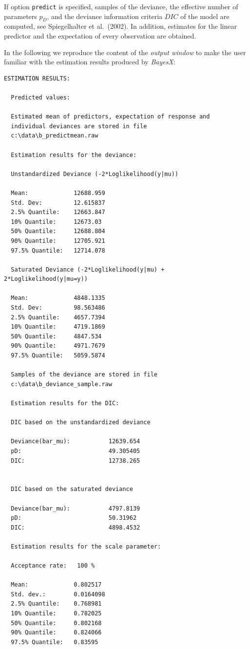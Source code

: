 \documentclass[11pt,a4paper,twoside]{bayesxreport}
\begin{document}
If option {\tt predict} is specified, samples of the deviance, the
effective number of parameters $p_D$, and the deviance information
criteria $DIC$ of the model are computed, see Spiegelhalter et
al.~(2002). In addition, estimates for the linear predictor and the
expectation of every observation are obtained.

In the following we reproduce the content of the {\em output window}
to make the user familiar with the estimation results produced by
{\em BayesX}:

\footnotesize
\begin{verbatim}
ESTIMATION RESULTS:

  Predicted values:

  Estimated mean of predictors, expectation of response and
  individual deviances are stored in file
  c:\data\b_predictmean.raw

  Estimation results for the deviance:

  Unstandardized Deviance (-2*Loglikelihood(y|mu))

  Mean:             12688.959
  Std. Dev:         12.615837
  2.5% Quantile:    12663.847
  10% Quantile:     12673.03
  50% Quantile:     12688.804
  90% Quantile:     12705.921
  97.5% Quantile:   12714.078

  Saturated Deviance (-2*Loglikelihood(y|mu) + 2*Loglikelihood(y|mu=y))

  Mean:             4848.1335
  Std. Dev:         98.563486
  2.5% Quantile:    4657.7394
  10% Quantile:     4719.1869
  50% Quantile:     4847.534
  90% Quantile:     4971.7679
  97.5% Quantile:   5059.5874

  Samples of the deviance are stored in file
  c:\data\b_deviance_sample.raw

  Estimation results for the DIC:

  DIC based on the unstandardized deviance

  Deviance(bar_mu):           12639.654
  pD:                         49.305405
  DIC:                        12738.265


  DIC based on the saturated deviance

  Deviance(bar_mu):           4797.8139
  pD:                         50.31962
  DIC:                        4898.4532

  Estimation results for the scale parameter:

  Acceptance rate:   100 %

  Mean:             0.802517
  Std. dev.:        0.0164098
  2.5% Quantile:    0.768981
  10% Quantile:     0.782025
  50% Quantile:     0.802168
  90% Quantile:     0.824066
  97.5% Quantile:   0.83595



\end{verbatim}
\end{document}
